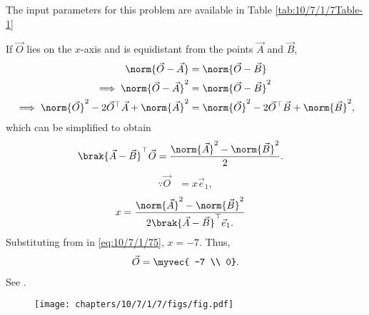 		The input parameters for this problem are available in Table \ref{tab:10/7/1/7Table-1}
\begin{table}[H]

\caption{}
\label{tab:10/7/1/7Table-1}	
\end{table}
%
  If $\vec{O}$ lies on the  $x$-axis and is  equidistant from the points $\vec{A}$ and $\vec{B}$, 
\begin{align}
 \norm{\vec{O}-\vec{A}} &=
\norm{\vec{O}-\vec{B}} 
\\
 \implies \norm{\vec{O}-\vec{A}}^2 &=
\norm{\vec{O}-\vec{B}}^2 
\\
 \implies \norm{\vec{O}}^2-2{\vec{O}}^{\top}\vec{A} + \norm{\vec{A}}^2
	&= \norm{\vec{O}}^2-2{\vec{O}}^{\top}\vec{B} + \norm{\vec{B}}^2,
\end{align}
which can be simplified to obtain
  \begin{align}
	  \brak{\vec{A}-\vec{B}}^\top   \vec{O}&=\frac{\norm{\vec{A}}^2 -\norm{\vec{B}}^2 }{2}.
  \end{align}
  \begin{align}
  \because
   \vec{O} &=
    x\vec{e}_1,
  \end{align}
  \begin{align}
   x &=\frac{\norm{\vec{A}}^2 -\norm{\vec{B}}^2 }{2\brak{\vec{A}-\vec{B}}^{\top }\vec{e}_1.
}\label{eq:10/7/1/75}  
  \end{align}
  Substituting from  in \eqref{eq:10/7/1/75},
 $x =  -7$.  Thus, 
		\begin{align}
\vec{O} = \myvec{ -7 \\ 0}.
		\end{align}
		See  
.
\begin{figure}[H]
 \begin{center}
  \texttt{[image: chapters/10/7/1/7/figs/fig.pdf]}
 \end{center}
\caption{}
\label{fig:10/7/1/7Fig1}
\end{figure}

